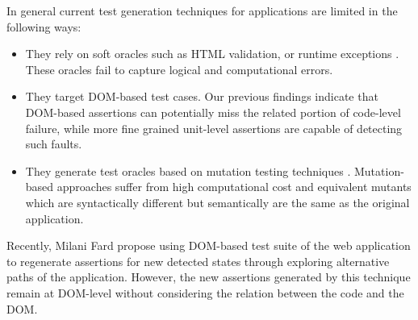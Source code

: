 In general current test generation techniques for \javascript applications are limited in the following ways:
\begin{itemize}[noitemsep]
\item They rely on soft oracles such as HTML validation, or runtime exceptions \cite{artzi:icse11}. These oracles fail to capture logical and computational errors. 
\item They target DOM-based test cases. Our previous findings \cite{mirshokraie:icst15} indicate that DOM-based assertions can potentially miss the related portion of
code-level failure, while more fine grained unit-level assertions are capable of detecting such faults.
\item They generate test oracles based on mutation testing techniques \cite{mirshokraie:icst15, fraser:tse12}. Mutation-based approaches suffer from high computational cost and equivalent mutants which are syntactically different but semantically are the same as the original application. 
\end{itemize}
Recently, Milani Fard \etal propose using DOM-based test suite of the web application to regenerate assertions for new detected states through exploring alternative paths of the application. However, the new assertions generated by this technique remain at DOM-level without considering the relation between the \javascript code and the DOM.


